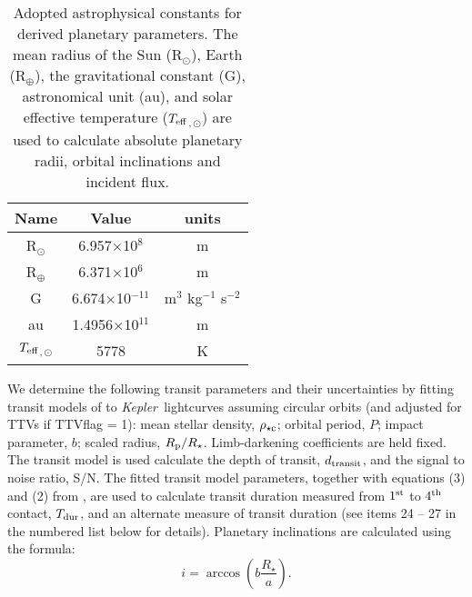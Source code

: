 \documentclass{aastex62}
\newcommand{\ik}{{\it Kepler~}}
\newcommand{\teff}{\ensuremath{T_{\rm eff}}}
\newcommand{\rprs}{\ensuremath{R_{\rm p}/R_\star}}
\newcommand{\rhoc}{\ensuremath{\rho_{\star {\rm c}}}}
\begin{document}
\begin{table}[!hbt]
    \centering
    \begin{tabular}{c c c}
    \hline
        Name & Value & units \\
    \hline
    R$_{\odot}$     & 6.957$\times$10$^8$     & m \\
    R$_{\oplus}$    & 6.371$\times$10$^6$     & m \\
    G               & 6.674$\times$10$^{-11}$ & m$^3$ kg$^{-1}$ s$^{-2}$ \\
    au              & 1.4956$\times$10$^{11}$ & m \\
    \teff$_{,\odot}$ & 5778                    & K \\
    \hline
    \end{tabular}
    \caption{Adopted astrophysical constants for derived planetary parameters.  The mean radius of the Sun (R$_{\odot}$), Earth (R$_{\oplus}$), the gravitational constant (G), astronomical unit (au), and solar effective temperature (\teff$_{,\odot}$) are used to calculate absolute planetary radii, orbital inclinations and incident flux.}
    \label{tab:astro_constants}
\end{table}


We determine the following transit parameters and their uncertainties by fitting transit models of \citet{Mandel:2002} to \ik lightcurves assuming circular orbits (and adjusted for TTVs if TTVflag = 1): mean stellar density, \rhoc; orbital period, $P$; impact parameter, $b$; scaled radius, \rprs.  Limb-darkening coefficients are held fixed. The transit model is used calculate the depth of transit, $d_{\rm transit}$, and the signal to noise ratio, S/N.  The fitted transit model parameters, together with equations (3) and (2) from \citet{Seager:2003}, are used to calculate transit duration measured from $1^{\rm st}$ to $4^{\rm th}$ contact, $T_{\rm dur}$, and an alternate measure of transit duration (see items 24 -- 27 in the numbered list below for details).
Planetary inclinations are calculated using the formula: 
\begin{equation}
i = \arccos{\left(b\frac{R_\star}{a}\right)}.
\end{equation}
\end{document}

